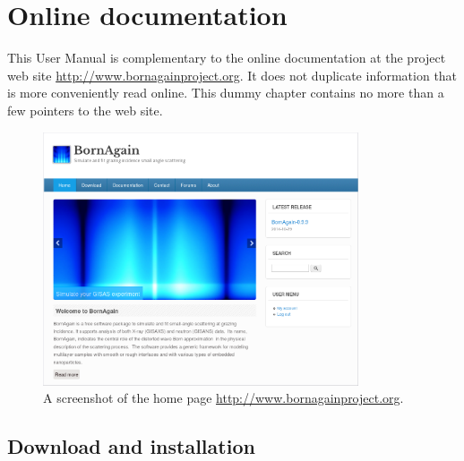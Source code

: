 

\newpage
\chapter{Online documentation}

This User Manual is complementary to the online documentation
at the project web site \url{http://www.bornagainproject.org}.
It does not duplicate information that is more conveniently
read online.
This dummy chapter contains no more than a few pointers to the web site.

\begin{figure}[ht]
\begin{center}
\includegraphics[width=0.83\textwidth]{fig/screenshot/website.png}
\end{center}
\caption{A screenshot of the home page
         \url{http://www.bornagainproject.org}.}
\label{fig:website}
\end{figure}


\section{Download and installation}

